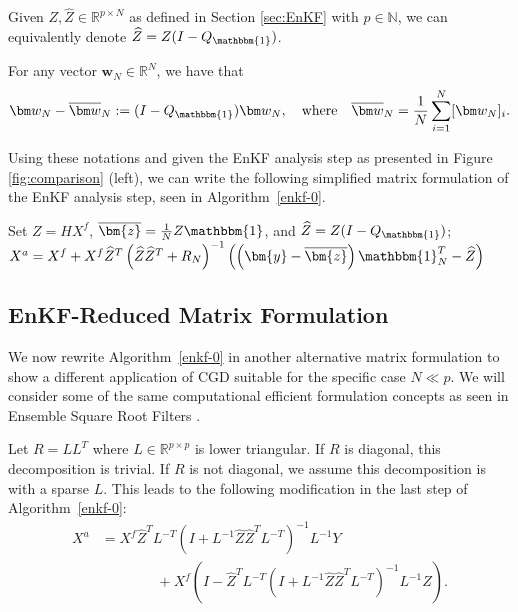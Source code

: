 \documentclass[11p]{elsarticle}
\numberwithin{equation}{section}
\begin{document}
Given $Z,\widehat{Z}\in\mathbb{R}^{p\times N}$ as defined in Section \ref{sec:EnKF} with $p\in \mathbb{N}$, we can equivalently denote $\widehat Z=Z(I-Q_{\mathbbm{1}})$.







For any vector $\bm w_N\in \mathbb{R}^N$, we have that 
\begin{equation}
\bm w_N - \overline{\bm w}_N:=(I-Q_{\mathbbm{1}})\bm w_N,
\quad \mbox{where}\quad \overline{\bm w}_N=\frac{1}{N}\sum_{i=1}^N[\bm w_N]_i.
\end{equation}

Using these notations and given the EnKF analysis step as presented in Figure \ref{fig:comparison} (left), we can write the following simplified matrix formulation of the EnKF analysis step, seen in Algorithm~\ref{enkf-0}.


\begin{algorithm}[H]
\caption{Exact EnKF Analysis (Matrix Formulation)\label{enkf-0}}
\begin{algorithmic}[1]
\State     Set \(Z = H X^f\), \(\overline{\bm{z}}=\frac{1}{N}Z\mathbbm{1}\), and \(\widehat Z=Z(I-Q_{\mathbbm{1}})\); 
\State \(
X^a=X^f+X^f\widehat{Z}^T\left(\widehat{Z}\widehat{Z}^T+R_N\right)^{-1}\left(\left(\bm{y}-\overline{\bm{z}}\right)\mathbbm{1}_N^T-\widehat{Z}\right)
\)
\State {}
\EndFunction
\end{algorithmic}
\end{algorithm}



\subsection{EnKF-Reduced Matrix Formulation}

We now rewrite Algorithm~\ref{enkf-0} in another alternative matrix formulation to show a different application of CGD suitable for the specific case $N\ll p$.  We will consider some of the same computational efficient formulation concepts as seen in Ensemble Square Root Filters \cite{Tippett2003, Mandel2006}.

Let $R=LL^T$ where $L \in\mathbb{R}^{p\times p}$ is lower triangular. If $R$ is diagonal, this decomposition is trivial. If $R$ is not diagonal, we assume this decomposition is with a sparse $L$. This leads to the following modification in the last step of Algorithm~\ref{enkf-0}:
\begin{equation}\label{LL-0}
\begin{aligned}
X^a &= X^f\widehat{Z}^TL^{-T}\left(I+L^{-1}\widehat{Z}\widehat{Z}^TL^{-T}\right)^{-1}L^{-1}Y\\
&~~~~~~~~~~~~~~~~~~+X^f\left( I - \widehat{Z}^TL^{-T}\left(I+L^{-1}\widehat{Z}\widehat{Z}^TL^{-T}\right)^{-1}L^{-1}Z\right).
\end{aligned}
\end{equation}
\end{document}
